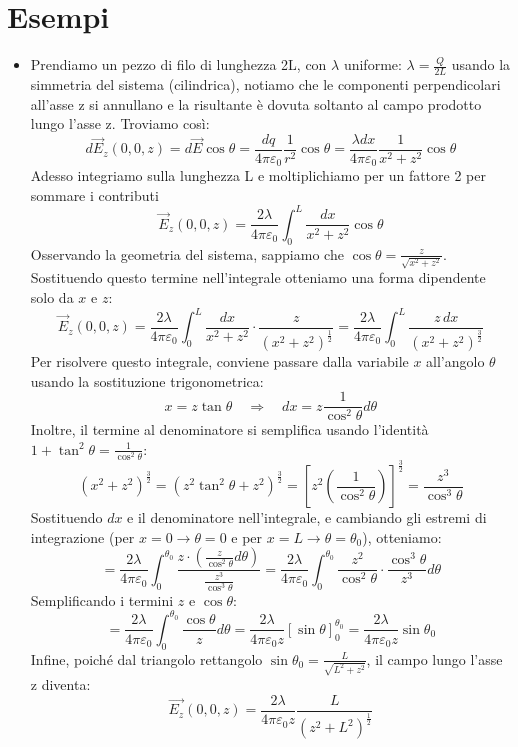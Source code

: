\documentclass{book}
\begin{document}
\section{Esempi}
\begin{itemize}
\item 
Prendiamo un pezzo di filo di lunghezza 2L, con $\lambda$ uniforme: $\lambda = \frac{Q}{2L}$
usando la simmetria del sistema (cilindrica), notiamo che le componenti perpendicolari all'asse z si annullano e la risultante è dovuta soltanto al campo prodotto lungo l'asse z.
Troviamo così:
$$
d\vec{E}_z(0,0,z)= d\vec{E} \cos{\theta} = \frac{dq}{4 \pi \varepsilon_0} \frac{1}{r^2 } \cos{\theta} = \frac{\lambda dx}{4 \pi \varepsilon_0} \frac{1}{x^2 + z^2} \cos{\theta}
$$
Adesso integriamo sulla lunghezza L e moltiplichiamo per un fattore 2 per sommare i contributi 
$$
\vec{E}_z(0,0,z)= \frac{2 \lambda }{4 \pi \varepsilon_0} \int_0^L \frac{dx}{x^2 + z^2} \cos{\theta}
$$
Osservando la geometria del sistema, sappiamo che $\cos\theta = \frac{z}{\sqrt{x^2+z^2}}$. Sostituendo questo termine nell'integrale otteniamo una forma dipendente solo da $x$ e $z$:
$$
\vec{E}_z(0,0,z)= \frac{2 \lambda }{4 \pi \varepsilon_0} \int_0^L \frac{dx}{x^2 + z^2} \cdot \frac{z}{(x^2+z^2)^{\frac{1}{2}}} = \frac{2 \lambda }{4 \pi \varepsilon_0} \int_0^L \frac{z \, dx}{(x^2 + z^2)^{\frac{3}{2}}}
$$
Per risolvere questo integrale, conviene passare dalla variabile $x$ all'angolo $\theta$ usando la sostituzione trigonometrica:
$$
x = z \tan\theta \quad \Longrightarrow \quad dx = z \frac{1}{\cos^2\theta} d\theta
$$
Inoltre, il termine al denominatore si semplifica usando l'identità $1+\tan^2\theta = \frac{1}{\cos^2\theta}$:
$$
(x^2 + z^2)^{\frac{3}{2}} = \left(z^2 \tan^2\theta + z^2\right)^{\frac{3}{2}} = \left[ z^2 \left(\frac{1}{\cos^2\theta}\right) \right]^{\frac{3}{2}} = \frac{z^3}{\cos^3\theta}
$$
Sostituendo $dx$ e il denominatore nell'integrale, e cambiando gli estremi di integrazione (per $x=0 \to \theta=0$ e per $x=L \to \theta=\theta_0$), otteniamo:
$$
= \frac{2 \lambda }{4 \pi \varepsilon_0} \int_0^{\theta_0} \frac{z \cdot \left( \frac{z}{\cos^2\theta} d\theta \right)}{ \frac{z^3}{\cos^3\theta} } 
= \frac{2 \lambda }{4 \pi \varepsilon_0} \int_0^{\theta_0} \frac{z^2}{\cos^2\theta} \cdot \frac{\cos^3\theta}{z^3} d\theta
$$
Semplificando i termini $z$ e $\cos\theta$:
$$
=  \frac{2 \lambda }{4 \pi \varepsilon_0} \int_0^{\theta_0} \frac{\cos{\theta}}{z} d\theta =   \frac{2 \lambda }{4 \pi \varepsilon_0 z} \left[ \sin{\theta} \right]_0^{\theta_0} = \frac{2 \lambda}{4 \pi \varepsilon_0 z} \sin{\theta_0}
$$
Infine, poiché dal triangolo rettangolo $\sin{\theta_0} = \frac{L}{\sqrt{L^2+z^2}}$, il campo lungo l'asse z diventa:
$$
\vec{E_z}(0,0,z) =  \frac{2 \lambda}{4 \pi \varepsilon_0 z}  \frac{L}{\left( z^2 + L^2 \right)^{\frac{1}{2}}}
$$


\end{itemize}
\end{document}
